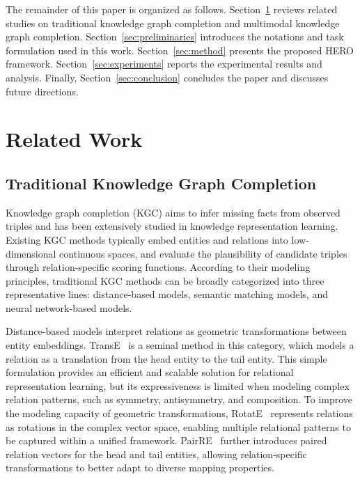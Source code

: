 \documentclass[pdflatex,sn-mathphys-num]{sn-jnl}
\begin{document}
The remainder of this paper is organized as follows. Section~\ref{sec:related_work} reviews related studies on traditional knowledge graph completion and multimodal knowledge graph completion. Section~\ref{sec:preliminaries} introduces the notations and task formulation used in this work. Section~\ref{sec:method} presents the proposed HERO framework. Section~\ref{sec:experiments} reports the experimental results and analysis. Finally, Section~\ref{sec:conclusion} concludes the paper and discusses future directions.

\section{Related Work}
\label{sec:related_work}
\subsection{Traditional Knowledge Graph Completion}

Knowledge graph completion (KGC) aims to infer missing facts from observed triples and has been extensively studied in knowledge representation learning. Existing KGC methods typically embed entities and relations into low-dimensional continuous spaces, and evaluate the plausibility of candidate triples through relation-specific scoring functions. According to their modeling principles, traditional KGC methods can be broadly categorized into three representative lines: distance-based models, semantic matching models, and neural network-based models.

Distance-based models interpret relations as geometric transformations between entity embeddings. TransE~\cite{bordes2013transe} is a seminal method in this category, which models a relation as a translation from the head entity to the tail entity. This simple formulation provides an efficient and scalable solution for relational representation learning, but its expressiveness is limited when modeling complex relation patterns, such as symmetry, antisymmetry, and composition. To improve the modeling capacity of geometric transformations, RotatE~\cite{sun2019rotate} represents relations as rotations in the complex vector space, enabling multiple relational patterns to be captured within a unified framework. PairRE~\cite{chao2021pairre} further introduces paired relation vectors for the head and tail entities, allowing relation-specific transformations to better adapt to diverse mapping properties.
\end{document}
